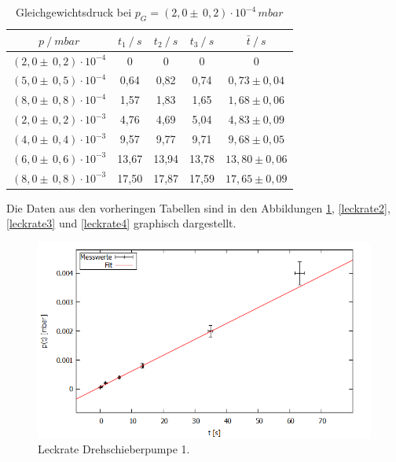 \begin{table}[H]
\centering
\label{tab:leck_Turbo4}
\begin{tabular}{c|c|c|c|c}
	{$p \:/\: \si{mbar}$} & {$t_1 \:/\: \si{s} $} & {$t_2 \:/\: \si{s} $} & {$t_3 \:/\: \si{s} $} & {$\bar{t} \:/\: \si{s}$}\\
\midrule
$(2,0 \pm \, 0,2)\cdot 10^{-4}$ &0 &0 &0 &0\\
$(5,0 \pm \, 0,5)\cdot 10^{-4}$ &   0,64 &  0,82 &  0,74 & $0,73 \pm 0,04$\\
$(8,0 \pm \, 0,8)\cdot 10^{-4}$ &   1,57  &  1,83 &  1,65 & $1,68 \pm 0,06 $\\
$(2,0 \pm \, 0,2)\cdot 10^{-3}$ &   4,76 &  4,69 &  5,04 & $4,83 \pm 0,09 $\\
$(4,0 \pm \, 0,4)\cdot 10^{-3}$ &   9,57 &  9,77 &  9,71 & $9,68 \pm 0,05 $\\
$(6,0 \pm \, 0,6)\cdot 10^{-3}$ &   13,67 &  13,94 &  13,78 & $13,80 \pm 0,06 $\\
$(8,0 \pm \, 0,8)\cdot 10^{-3}$ &  17,50 & 17,87 & 17,59 & $17,65 \pm 0,09 $\\
\end{tabular}
\caption{Gleichgewichtsdruck bei $p_G=(2,0 \pm \, 0,2)\cdot 10^{-4} \, \si{mbar}$}
\end{table}
Die Daten aus den vorheringen Tabellen sind in den Abbildungen \ref{leckrate1}, \ref{leckrate2}, \ref{leckrate3} und \ref{leckrate4} graphisch dargestellt.
\begin{figure}[H]
  \centering
  \includegraphics[width=14cm]{bilder/leckratefit1.png}
  \caption{Leckrate Drehschieberpumpe 1.}
  \label{leckrate1}
\end{figure}

